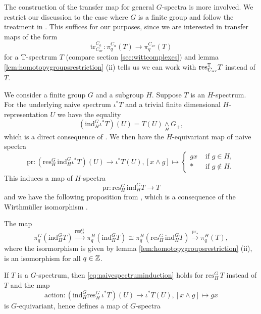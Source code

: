 The construction of the transfer map for general $G$-spectra is more involved.
We restrict our discussion to the case where $G$ is a finite group
and follow the treatment in \cite[Chapter~4]{schwedeequivariant}.
This suffices for our purposes, since we are interested in transfer maps of
the form
\[
\mathrm{tr}^{C_a}_{C_{ar}}:\pi_q^{C_a}(T)\to \pi_q^{C_{ar}}(T)
\]
for a $\mathbb{T}$-spectrum $T$ (compare section \ref{sec:wittcomplexes}) and 
lemma \ref{lem:homotopygroupsrestriction} (ii) tells us we can work
with $\mathrm{res}^{\mathbb{T}}_{C_{ar}} T$ instead of $T$.

We consider a finite group $G$ and a subgroup $H$. Suppose
$T$ is an $H$-spectrum. For the underlying naive spectrum
$\iota^\ast T$ and a trivial finite dimensional $H$-representation
$U$ we have the equality
\begin{equation}\label{eq:naivespectruminduction}
(\mathrm{ind}^G_H \iota^\ast T)(U) = T(U)\underset{H}{\wedge} G_+,
\end{equation}
which is a direct consequence of \cite[Construction~6.5, \pno~1519]{rvadams}.
We then have the $H$-equivariant map of naive spectra
\[
\mathrm{pr}:(\mathrm{res}^G_H\, \mathrm{ind}^G_H \iota^\ast T)(U)\to 
 \iota^\ast T(U), [x\wedge g]\mapsto
\begin{cases}
gx &\text{ if } g\in H,\\
\ast &\text{ if } g\not \in H.
\end{cases}
\]
This induces a map of $H$-spectra
\[
\mathrm{pr}:\mathrm{res}^G_H\, \mathrm{ind}^G_H  T \to T
\]
and we have the following proposition from \cite[Proposition~4.11, \pno~30]{schwedeequivariant},
which is a consequence of the Wirthm\"uller isomorphism \cite[Theorem~4.9, \pno~28]{schwedeequivariant}.
\begin{prop}
The map
\begin{equation}\label{eq:externaltransfer}
\pi_q^G(\mathrm{ind}^G_H T)\xrightarrow{\mathrm{res}^G_H\,} \pi_q^H(\mathrm{ind}^G_H T)
\cong \pi_q^H(\mathrm{res}^G_H\, \mathrm{ind}^G_H T)\xrightarrow{\mathrm{pr}_\ast}
\pi_q^H(T),
\end{equation}
where the isormorphism is given by lemma  \ref{lem:homotopygroupsrestriction} (ii),
is an isomorphism for all $q\in \mathbb{Z}$.
\end{prop}
If $T$ is a $G$-spectrum, then \eqref{eq:naivespectruminduction}  holds
for $\mathrm{res}^G_H\, T$ instead of $T$ and the map
\[
\mathrm{action}: (\mathrm{ind}^G_H \mathrm{res}^G_H\, \iota^\ast T)(U)
\to \iota^\ast T(U), [x\wedge g]\mapsto gx
\]
is $G$-equivariant, hence defines a map of $G$-spectra
